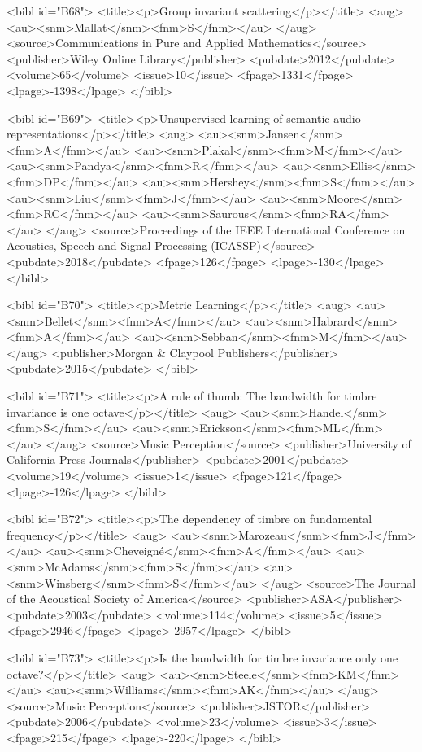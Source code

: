 \documentclass{bmcart}
\begin{document}
\begin{backmatter}
{<bibl id="B68">
  <title><p>Group invariant scattering</p></title>
  <aug>
    <au><snm>Mallat</snm><fnm>S</fnm></au>
  </aug>
  <source>Communications in Pure and Applied Mathematics</source>
  <publisher>Wiley Online Library</publisher>
  <pubdate>2012</pubdate>
  <volume>65</volume>
  <issue>10</issue>
  <fpage>1331</fpage>
  <lpage>-1398</lpage>
</bibl>

<bibl id="B69">
  <title><p>Unsupervised learning of semantic audio representations</p></title>
  <aug>
    <au><snm>Jansen</snm><fnm>A</fnm></au>
    <au><snm>Plakal</snm><fnm>M</fnm></au>
    <au><snm>Pandya</snm><fnm>R</fnm></au>
    <au><snm>Ellis</snm><fnm>DP</fnm></au>
    <au><snm>Hershey</snm><fnm>S</fnm></au>
    <au><snm>Liu</snm><fnm>J</fnm></au>
    <au><snm>Moore</snm><fnm>RC</fnm></au>
    <au><snm>Saurous</snm><fnm>RA</fnm></au>
  </aug>
  <source>Proceedings of the IEEE International Conference on Acoustics, Speech
  and Signal Processing (ICASSP)</source>
  <pubdate>2018</pubdate>
  <fpage>126</fpage>
  <lpage>-130</lpage>
</bibl>

<bibl id="B70">
  <title><p>{M}etric {L}earning</p></title>
  <aug>
    <au><snm>Bellet</snm><fnm>A</fnm></au>
    <au><snm>Habrard</snm><fnm>A</fnm></au>
    <au><snm>Sebban</snm><fnm>M</fnm></au>
  </aug>
  <publisher>{M}organ \& {C}laypool {P}ublishers</publisher>
  <pubdate>2015</pubdate>
</bibl>

<bibl id="B71">
  <title><p>A rule of thumb: The bandwidth for timbre invariance is one
  octave</p></title>
  <aug>
    <au><snm>Handel</snm><fnm>S</fnm></au>
    <au><snm>Erickson</snm><fnm>ML</fnm></au>
  </aug>
  <source>Music Perception</source>
  <publisher>University of California Press Journals</publisher>
  <pubdate>2001</pubdate>
  <volume>19</volume>
  <issue>1</issue>
  <fpage>121</fpage>
  <lpage>-126</lpage>
</bibl>

<bibl id="B72">
  <title><p>The dependency of timbre on fundamental frequency</p></title>
  <aug>
    <au><snm>Marozeau</snm><fnm>J</fnm></au>
    <au><snm>Cheveign{\'e}</snm><fnm>A</fnm></au>
    <au><snm>McAdams</snm><fnm>S</fnm></au>
    <au><snm>Winsberg</snm><fnm>S</fnm></au>
  </aug>
  <source>The Journal of the Acoustical Society of America</source>
  <publisher>ASA</publisher>
  <pubdate>2003</pubdate>
  <volume>114</volume>
  <issue>5</issue>
  <fpage>2946</fpage>
  <lpage>-2957</lpage>
</bibl>

<bibl id="B73">
  <title><p>Is the bandwidth for timbre invariance only one octave?</p></title>
  <aug>
    <au><snm>Steele</snm><fnm>KM</fnm></au>
    <au><snm>Williams</snm><fnm>AK</fnm></au>
  </aug>
  <source>Music Perception</source>
  <publisher>JSTOR</publisher>
  <pubdate>2006</pubdate>
  <volume>23</volume>
  <issue>3</issue>
  <fpage>215</fpage>
  <lpage>-220</lpage>
</bibl>

}
\end{backmatter}
\end{document}
